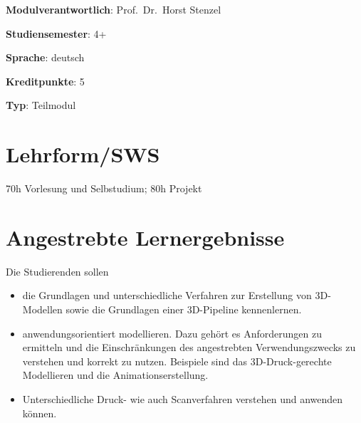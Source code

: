 \begin{modulHead}
\textbf{Modulverantwortlich}: Prof.~Dr.~Horst
Stenzel
\end{modulHead}
\begin{modulHead}
\textbf{Studiensemester}:
4+
\end{modulHead}
\begin{modulHead}
\textbf{Sprache}:
deutsch
\end{modulHead}
\begin{modulHead}
\textbf{Kreditpunkte}:
5
\end{modulHead}
\begin{modulHead}
\textbf{Typ}:
Teilmodul
\end{modulHead}


\hypertarget{lehrformswspathlabelmi-2017modulbeschreibungen-bachelorba_wpf-3d-msd}{%
\section*{Lehrform/SWS\label{/mi-2017/modulbeschreibungen-bachelor/BA_WPF-3D-MSD}}\label{lehrformswspathlabelmi-2017modulbeschreibungen-bachelorba_wpf-3d-msd}}

70h Vorlesung und Selbstudium; 80h Projekt

\hypertarget{angestrebte-lernergebnissepathlabelmi-2017modulbeschreibungen-bachelorba_wpf-3d-msd}{%
\section*{Angestrebte
Lernergebnisse\label{/mi-2017/modulbeschreibungen-bachelor/BA_WPF-3D-MSD}}\label{angestrebte-lernergebnissepathlabelmi-2017modulbeschreibungen-bachelorba_wpf-3d-msd}}

Die Studierenden sollen

\begin{itemize}
\tightlist
\item
  die Grundlagen und unterschiedliche Verfahren zur Erstellung von
  3D-Modellen sowie die Grundlagen einer 3D-Pipeline kennenlernen.
\item
  anwendungsorientiert modellieren. Dazu gehört es Anforderungen zu
  ermitteln und die Einschränkungen des angestrebten Verwendungszwecks
  zu verstehen und korrekt zu nutzen. Beispiele sind das
  3D-Druck-gerechte Modellieren und die Animationserstellung.
\item
  Unterschiedliche Druck- wie auch Scanverfahren verstehen und anwenden
  können.
\end{itemize}

